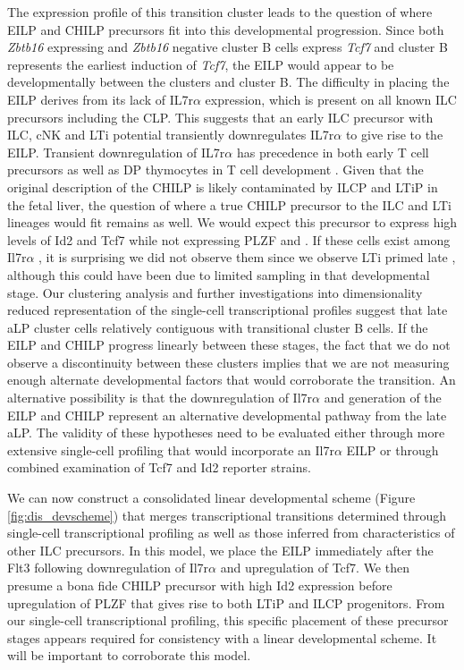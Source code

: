 The expression profile of this transition cluster leads to the question of where EILP and CHILP precursors fit into this developmental progression. Since both \textit{Zbtb16} expressing and \textit{Zbtb16} negative cluster B cells express \textit{Tcf7} and cluster B represents the earliest induction of \textit{Tcf7}, the EILP would appear to be developmentally between the \aLP clusters and cluster B. The difficulty in placing the EILP derives from its lack of IL7r$\alpha$ expression, which is present on all known ILC precursors including the CLP. This suggests that an early ILC precursor with ILC, cNK and LTi potential transiently downregulates IL7r$\alpha$ to give rise to the EILP. Transient downregulation of IL7r$\alpha$ has precedence in both early T cell precursors as well as DP thymocytes in T cell development \cite{schlenner2010,allman2003,mazzucchelli2007}. Given that the original description of the CHILP is likely contaminated by ILCP and LTiP in the fetal liver, the question of where a true CHILP precursor to the ILC and LTi lineages would fit remains as well. We would expect this precursor to express high levels of Id2 and Tcf7 while not expressing PLZF and \RORgt. If these cells exist among Il7r$\alpha$\UP{} \aLP, it is surprising we did not observe them since we observe LTi primed late \aLP, although this could have been due to limited sampling in that developmental stage. Our clustering analysis and further investigations into dimensionality reduced representation of the single-cell transcriptional profiles suggest that late aLP cluster cells relatively contiguous with transitional cluster B cells. If the EILP and CHILP progress linearly between these stages, the fact that we do not observe a discontinuity between these clusters implies that we are not measuring enough alternate developmental factors that would corroborate the transition. An alternative possibility is that the downregulation of Il7r$\alpha$ and generation of the EILP and CHILP represent an alternative developmental pathway from the late aLP. The validity of these hypotheses need to be evaluated either through more extensive single-cell profiling that would incorporate an Il7r$\alpha$\UM{} EILP or through combined examination of Tcf7 and Id2 reporter strains. 

We can now construct a consolidated linear developmental scheme (Figure \ref{fig:dis_devscheme}) that merges transcriptional transitions determined through single-cell transcriptional profiling as well as those inferred from characteristics of other ILC precursors. In this model, we place the EILP immediately after the Flt3\UM{} \aLP following downregulation of Il7r$\alpha$ and upregulation of Tcf7. We then presume a bona fide CHILP precursor with high Id2 expression before upregulation of PLZF that gives rise to both LTiP and ILCP progenitors. From our single-cell transcriptional profiling, this specific placement of these precursor stages appears required for consistency with a linear developmental scheme. It will be important to corroborate this model.

